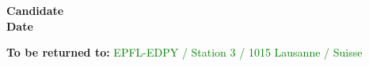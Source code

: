 \documentclass[11pt,titlepage]{article}
\begin{document}
\noindent \textbf{Candidate}\hspace{7cm}\dotfill\vspace{0.5cm}\\

\noindent \textbf{Date}\hspace{8.05cm}\dotfill\\

\vspace{0.8cm}
\begin{center}
\textbf{To be returned to:} \textcolor{green}{EPFL-EDPY / Station 3 
                                              / 1015 Lausanne / Suisse}
\end{center}
\end{document}
